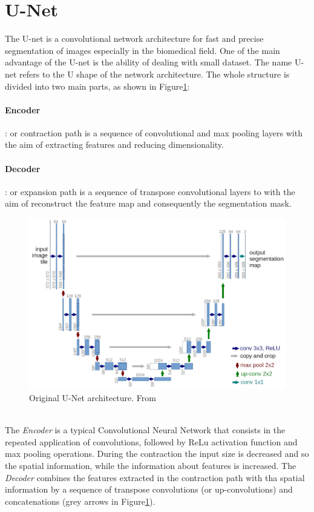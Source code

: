 \documentclass{standalone}
\begin{document}
\section{U-Net}
The U-net is a convolutional network architecture for fast and precise segmentation of images especially in the biomedical field\cite{unet}.
One of the main advantage of the U-net is the ability of dealing with small dataset. The name U-net refers to the U shape of the network architecture. 
The whole structure is divided into two main parts, as shown in Figure\ref{fig:unet}:

\paragraph{Encoder}:
or contraction path is a sequence of convolutional and max pooling layers with the aim of extracting features and reducing dimensionality.

\paragraph{Decoder}:
or expansion path is a sequence of transpose convolutional layers to with the aim of reconstruct the feature map and consequently the segmentation mask.
\begin{figure}[htp]

    \centering
    \includegraphics[width=.9\textwidth]{../images/U-Net arch.jpeg}
    
    \caption{Original U-Net architecture. From\cite{unet}}
    \label{fig:unet}
    
    \end{figure}
\\
The \textit{Encoder} is a typical Convolutional Neural Network that consists in the repeated application of convolutions, followed by ReLu activation function and max pooling operations.
During the contraction the input size is decreased and so the spatial information, while the information about features is increased.
The \textit{Decoder} combines the features extracted in the contraction path  with tha spatial information by a sequence of transpose convolutions (or up-convolutions) and concatenations (grey arrows in Figure\ref{fig:unet}).
\end{document}
